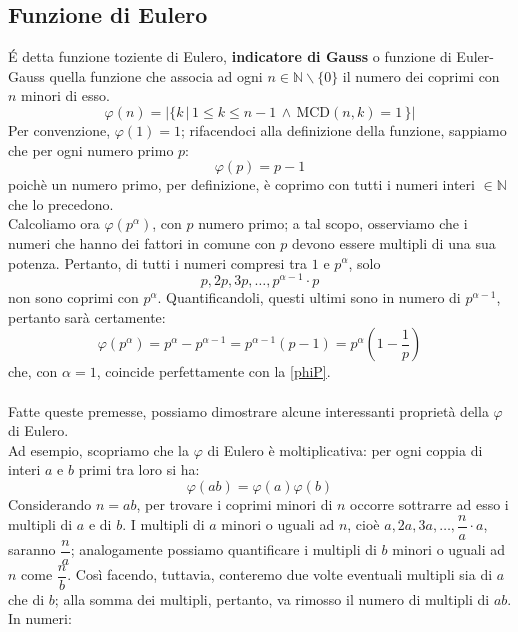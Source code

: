 \subsection{Funzione di Eulero}
\'E detta funzione toziente di Eulero, \textbf{indicatore di Gauss} o funzione di Euler-Gauss quella funzione che associa ad ogni $n \in \mathbb{N}\backslash \{0\}$ il numero dei coprimi con $n$ minori di esso.
\begin{equation}\label{phi}
\varphi(n)=\bigg|\{k \, |\, 1 \leq k \leq n-1 \, \land \, \text{MCD}(n,k)=1\, \}\bigg|
\end{equation}
Per convenzione, $\varphi(1)=1$; rifacendoci alla definizione della funzione, sappiamo che per ogni numero primo $p$:
\begin{equation}\label{phiP}
    \varphi(p)=p-1
\end{equation}
poichè un numero primo, per definizione, è coprimo con tutti i numeri interi $\in \mathbb{N}$ che lo precedono.\\
Calcoliamo ora $\varphi(p^\alpha)$, con $p$ numero primo; a tal scopo, osserviamo che i numeri che hanno dei fattori in comune con $p$ devono essere multipli di una sua potenza. Pertanto, di tutti i numeri compresi tra $1$ e $p^\alpha$, solo
\begin{equation*}
    p,2p,3p,\hdots,p^{\alpha-1}\cdot p
\end{equation*}
non sono coprimi con $p^\alpha$. Quantificandoli, questi ultimi sono in numero di $p^{\alpha-1}$, pertanto sarà certamente:
\begin{equation}\label{phiPa}
\varphi(p^\alpha)=p^\alpha-p^{\alpha-1}=p^{\alpha-1}\left(p-1\right)=p^\alpha \left(1-\frac{1}{p}\right)
\end{equation}
che, con $\alpha=1$, coincide perfettamente con la \eqref{phiP}.\\\\
Fatte queste premesse, possiamo dimostrare alcune interessanti proprietà della $\varphi$ di Eulero.\\
Ad esempio, scopriamo che la $\varphi$ di Eulero è moltiplicativa: per ogni coppia di interi $a$ e $b$ primi tra loro si ha:
\begin{equation}\label{phiAB}
\varphi(ab)=\varphi(a)\varphi(b)
\end{equation}
Considerando $n=ab$, per trovare i coprimi minori di $n$ occorre sottrarre ad esso i multipli di $a$ e di $b$. I multipli di $a$ minori o uguali ad $n$, cioè $a,2a,3a,\hdots,\dfrac{n}{a}\cdot a$, saranno $\dfrac{n}{a}$; analogamente possiamo quantificare i multipli di $b$ minori o uguali ad $n$ come $\dfrac{n}{b}$. Così facendo, tuttavia, conteremo due volte eventuali multipli sia di $a$ che di $b$; alla somma dei multipli, pertanto, va rimosso il numero di multipli di $ab$. In numeri:
